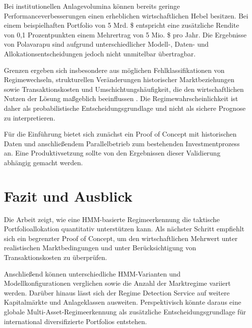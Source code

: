\vspace{0.5cm}

Bei institutionellen Anlagevolumina können bereits geringe Performanceverbesserungen einen erheblichen wirtschaftlichen Hebel besitzen. Bei einem beispielhaften Portfolio von 5 Mrd. \$ entspricht eine zusätzliche Rendite von 0,1 Prozentpunkten einem Mehrertrag von 5 Mio. \$ pro Jahr. Die Ergebnisse von Polavarapu sind aufgrund unterschiedlicher Modell-, Daten- und Allokationsentscheidungen jedoch nicht unmitelbar übertragbar.

\vspace{0.5cm}

Grenzen ergeben sich insbesondere aus möglichen Fehlklassifikationen von Regimewechseln, strukturellen Veränderungen historischer Marktbeziehungen sowie Transaktionskosten und Umschichtungshäufigkeit, die den wirtschaftlichen Nutzen der Lösung maßgeblich beeinflussen \cite{ang_regime_2012}. Die Regimewahrscheinlichkeit ist daher als probabilistische Entscheidungsgrundlage und nicht als sichere Prognose zu interpretieren.

\vspace{0.5cm}

Für die Einführung bietet sich zunächst ein Proof of Concept mit historischen Daten und anschließendem Parallelbetrieb zum bestehenden Investmentprozess an. Eine Produktivsetzung sollte von den Ergebnissen dieser Validierung abhängig gemacht werden.

\section{Fazit und Ausblick}
Die Arbeit zeigt, wie eine HMM-basierte Regimeerkennung die taktische Portfolioallokation quantitativ unterstützen kann. Als nächster Schritt empfiehlt sich ein begrenzter Proof of Concept, um den wirtschaftlichen Mehrwert unter realistischen Marktbedingungen und unter Berücksichtigung von Transaktionskosten zu überprüfen.

\vspace{0.5cm}

Anschließend können unterschiedliche HMM-Varianten und Modellkonfigurationen verglichen sowie die Anzahl der Marktregime variiert werden. Darüber hinaus lässt sich der Regime Detection Service auf weitere Kapitalmärkte und Anlageklassen ausweiten. Perspektivisch könnte daraus eine globale Multi-Asset-Regimeerkennung als zusätzliche Entscheidungsgrundlage für international diversifizierte Portfolios entstehen.
